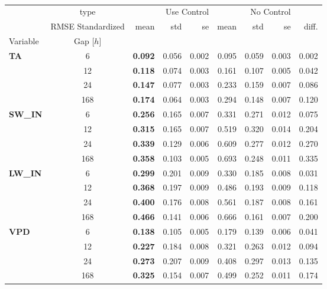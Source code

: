 \begin{table}
\centering
\caption{\CapControl}
\label{tbl:control}
\begin{tabular}{p{2.1cm}c|rrr|rrr|r}
\toprule
 & type & \multicolumn{3}{r}{Use Control} & \multicolumn{3}{r}{No Control} &  \\
 & RMSE Standardized & mean & std & se & mean & std & se & diff. \\
Variable & Gap [$h$] &  &  &  &  &  &  &  \\
\midrule
\multirow[c]{4}{*}{\parbox{2.1cm}{\textbf{TA}}} & 6 & \bfseries 0.092 & 0.056 & 0.002 & 0.095 & 0.059 & 0.003 & 0.002 \\
 & 12 & \bfseries 0.118 & 0.074 & 0.003 & 0.161 & 0.107 & 0.005 & 0.042 \\
 & 24 & \bfseries 0.147 & 0.077 & 0.003 & 0.233 & 0.159 & 0.007 & 0.086 \\
 & 168 & \bfseries 0.174 & 0.064 & 0.003 & 0.294 & 0.148 & 0.007 & 0.120 \\
\cline{1-9}
\multirow[c]{4}{*}{\parbox{2.1cm}{\textbf{SW\_IN}}} & 6 & \bfseries 0.256 & 0.165 & 0.007 & 0.331 & 0.271 & 0.012 & 0.075 \\
 & 12 & \bfseries 0.315 & 0.165 & 0.007 & 0.519 & 0.320 & 0.014 & 0.204 \\
 & 24 & \bfseries 0.339 & 0.129 & 0.006 & 0.609 & 0.277 & 0.012 & 0.270 \\
 & 168 & \bfseries 0.358 & 0.103 & 0.005 & 0.693 & 0.248 & 0.011 & 0.335 \\
\cline{1-9}
\multirow[c]{4}{*}{\parbox{2.1cm}{\textbf{LW\_IN}}} & 6 & \bfseries 0.299 & 0.201 & 0.009 & 0.330 & 0.185 & 0.008 & 0.031 \\
 & 12 & \bfseries 0.368 & 0.197 & 0.009 & 0.486 & 0.193 & 0.009 & 0.118 \\
 & 24 & \bfseries 0.400 & 0.176 & 0.008 & 0.561 & 0.187 & 0.008 & 0.161 \\
 & 168 & \bfseries 0.466 & 0.141 & 0.006 & 0.666 & 0.161 & 0.007 & 0.200 \\
\cline{1-9}
\multirow[c]{4}{*}{\parbox{2.1cm}{\textbf{VPD}}} & 6 & \bfseries 0.138 & 0.105 & 0.005 & 0.179 & 0.139 & 0.006 & 0.041 \\
 & 12 & \bfseries 0.227 & 0.184 & 0.008 & 0.321 & 0.263 & 0.012 & 0.094 \\
 & 24 & \bfseries 0.273 & 0.207 & 0.009 & 0.408 & 0.297 & 0.013 & 0.135 \\
 & 168 & \bfseries 0.325 & 0.154 & 0.007 & 0.499 & 0.252 & 0.011 & 0.174 \\
\cline{1-9}

\end{tabular}
\end{table}
